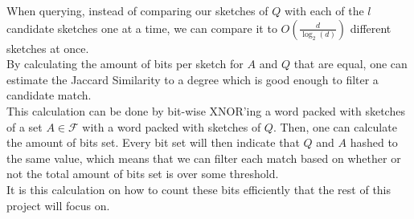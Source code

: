 When querying, instead of comparing our sketches of $Q$ with each of the $l$ candidate sketches one at a time, we can compare it to $O(\frac{d}{\log_2(d)})$ different sketches at once. \\
By calculating the amount of bits per sketch for $A$ and $Q$ that are equal, one can estimate the Jaccard Similarity to a degree which is good enough to filter a candidate match.\\
This calculation can be done by bit-wise XNOR'ing a word packed with sketches of a set $A\in \mathcal{F}$ with a word packed with sketches of $Q$. Then, one can calculate the amount of bits set. Every bit set will then indicate that $Q$ and $A$ hashed to the same value, which means that we can filter each match based on whether or not the total amount of bits set is over some threshold.\\
It is this calculation on how to count these bits efficiently that the rest of this project will focus on.

